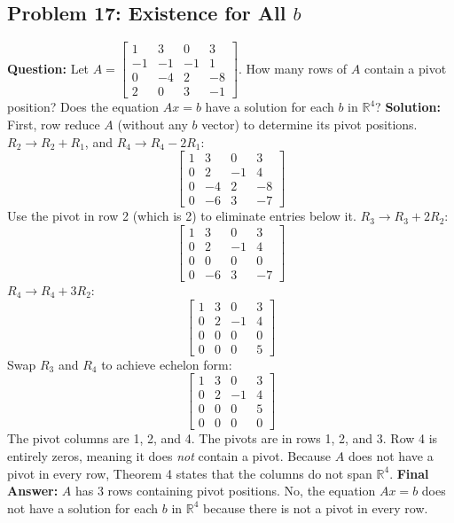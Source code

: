 \documentclass{article}
\begin{document}
\subsection{Problem 17: Existence for All $b$}
\textbf{Question:} Let $A = \begin{bmatrix} 1 & 3 & 0 & 3 \\ -1 & -1 & -1 & 1 \\ 0 & -4 & 2 & -8 \\ 2 & 0 & 3 & -1 \end{bmatrix}$. How many rows of $A$ contain a pivot position? Does the equation $Ax = b$ have a solution for each $b$ in $\mathbb{R}^4$?
\textbf{Solution:}
First, row reduce $A$ (without any $b$ vector) to determine its pivot positions.
$R_2 \to R_2 + R_1$, and $R_4 \to R_4 - 2R_1$:
\[ \begin{bmatrix} 1 & 3 & 0 & 3 \\ 0 & 2 & -1 & 4 \\ 0 & -4 & 2 & -8 \\ 0 & -6 & 3 & -7 \end{bmatrix} \]
Use the pivot in row 2 (which is 2) to eliminate entries below it.
$R_3 \to R_3 + 2R_2$:
\[ \begin{bmatrix} 1 & 3 & 0 & 3 \\ 0 & 2 & -1 & 4 \\ 0 & 0 & 0 & 0 \\ 0 & -6 & 3 & -7 \end{bmatrix} \]
$R_4 \to R_4 + 3R_2$:
\[ \begin{bmatrix} 1 & 3 & 0 & 3 \\ 0 & 2 & -1 & 4 \\ 0 & 0 & 0 & 0 \\ 0 & 0 & 0 & 5 \end{bmatrix} \]
Swap $R_3$ and $R_4$ to achieve echelon form:
\[ \begin{bmatrix} 1 & 3 & 0 & 3 \\ 0 & 2 & -1 & 4 \\ 0 & 0 & 0 & 5 \\ 0 & 0 & 0 & 0 \end{bmatrix} \]
The pivot columns are 1, 2, and 4. The pivots are in rows 1, 2, and 3. Row 4 is entirely zeros, meaning it does \textit{not} contain a pivot.
Because $A$ does not have a pivot in every row, Theorem 4 states that the columns do not span $\mathbb{R}^4$. 
\textbf{Final Answer:} $A$ has 3 rows containing pivot positions. No, the equation $Ax = b$ does not have a solution for each $b$ in $\mathbb{R}^4$ because there is not a pivot in every row.
\end{document}
